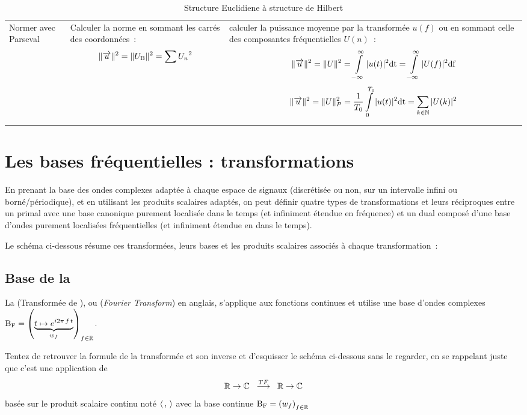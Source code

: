 \begin{table}[!ht]
\begin{tabular}{p{}|p{}|p{}}
    Normer avec Parseval  &  Calculer la norme en sommant les carrés des coordonnées~: $$\|\overrightarrow{u}\|^2=\|U_{\mathrm{B}}\|^2=\sum {U_n}^2$$ &  calculer la puissance moyenne par la transformée $u(f)$ ou en sommant celle des composantes fréquentielles $U(n)$~: $$\|\overrightarrow{u}\|^2=\|U\|^2=\int\limits_{-\infty}^{\infty}{|u(t)|^2\mathrm{d{t}}}=\int\limits_{-\infty}^{\infty}{|U(f)|^2\mathrm{d{f}}} $$  $$\|\overrightarrow{u}\|^2=\|U\|_P^2=\frac{1}{T_0}\int\limits_{0}^{T_0}{|u(t)|^2\mathrm{d{t}}}=\sum\limits_{k\in\mathbb{N}}{|U(k)|^2} $$
  \end{tabular}

  \caption{Structure Euclidiene à structure de Hilbert}
  \label{tab:hilbert}
\end{table}

\section{Les bases fréquentielles : transformations}

En prenant la base des ondes complexes adaptée à chaque espace de
signaux (discrétisée ou non, sur un intervalle infini ou
borné/périodique), et en utilisant les produits scalaires adaptés, on
peut définir quatre types de transformations et leurs réciproques
entre un primal avec une base canonique purement localisée dans le
temps (et infiniment étendue en fréquence) et un dual composé d'une
base d'ondes purement localisées fréquentielles (et infiniment étendue
en dans le temps).

Le schéma ci-dessous résume ces transformées, leurs bases et les
produits scalaires associés à chaque transformation~:



\subsection{Base de la \TF}

La \TF{} (Transformée de \Fourier), ou \FT{} (\emph{Fourier
  Transform}) en anglais, s'applique aux fonctions continues et
utilise une base d'ondes complexes
$\mathrm{B_F}=\left(\underbrace{t\mapsto e^{i2\pi\,f\,t}}_{w_f}\right)_{f\in\mathbb{R}}$.

\begin{exercice}
  Tentez de retrouver la formule de la transformée et son inverse et
  d'esquisser le schéma ci-dessous sans le regarder, en se rappelant
  juste que c'est une application
  de $$\mathbb{R}\rightarrow\mathbb{C}\;\;\overset{TF}{\longrightarrow}\;\;\mathbb{R}\rightarrow\mathbb{C}$$ basée
  sur le produit scalaire continu noté $\langle\,,\,\rangle$ avec la base
  continue $\mathrm{B_F}=\left(w_f\right)_{f\in\mathbb{R}}$
\end{exercice}


